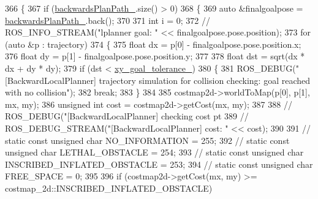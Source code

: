 \begin{DoxyCode}
{366             \{
367                 \textcolor{keywordflow}{if} (\hyperlink{classcl__move__base__z_1_1backward__local__planner_1_1BackwardLocalPlanner_ad9cde5c85f782cab2ddb4030e3c3f2cf}{backwardsPlanPath\_}.size() > 0)
368                 \{
369                     \textcolor{keyword}{auto} &finalgoalpose = \hyperlink{classcl__move__base__z_1_1backward__local__planner_1_1BackwardLocalPlanner_ad9cde5c85f782cab2ddb4030e3c3f2cf}{backwardsPlanPath\_}.back();
370 
371                     \textcolor{keywordtype}{int} i = 0;
372                     \textcolor{comment}{// ROS\_INFO\_STREAM("lplanner goal: " << finalgoalpose.pose.position);}
373                     \textcolor{keywordflow}{for} (\textcolor{keyword}{auto} &p : trajectory)
374                     \{
375                         \textcolor{keywordtype}{float} dx = p[0] - finalgoalpose.pose.position.x;
376                         \textcolor{keywordtype}{float} dy = p[1] - finalgoalpose.pose.position.y;
377 
378                         \textcolor{keywordtype}{float} dst = sqrt(dx * dx + dy * dy);
379                         \textcolor{keywordflow}{if} (dst < \hyperlink{classcl__move__base__z_1_1backward__local__planner_1_1BackwardLocalPlanner_aa4ec2c87947a3c08f8278eff052e7c8c}{xy\_goal\_tolerance\_})
380                         \{
381                             ROS\_DEBUG(\textcolor{stringliteral}{"[BackwardLocalPlanner] trajectory simulation for collision checking:
       goal reached with no collision"});
382                             \textcolor{keywordflow}{break};
383                         \}
384 
385                         costmap2d->worldToMap(p[0], p[1], mx, my);
386                         \textcolor{keywordtype}{unsigned} \textcolor{keywordtype}{int} cost = costmap2d->getCost(mx, my);
387 
388                         \textcolor{comment}{// ROS\_DEBUG("[BackwardLocalPlanner] checking cost pt %
389                         \textcolor{comment}{// ROS\_DEBUG\_STREAM("[BackwardLocalPlanner] cost: " << cost);}
390 
391                         \textcolor{comment}{// static const unsigned char NO\_INFORMATION = 255;}
392                         \textcolor{comment}{// static const unsigned char LETHAL\_OBSTACLE = 254;}
393                         \textcolor{comment}{// static const unsigned char INSCRIBED\_INFLATED\_OBSTACLE = 253;}
394                         \textcolor{comment}{// static const unsigned char FREE\_SPACE = 0;}
395 
396                         \textcolor{keywordflow}{if} (costmap2d->getCost(mx, my) >= costmap\_2d::INSCRIBED\_INFLATED\_OBSTACLE)
}}
\end{DoxyCode}
